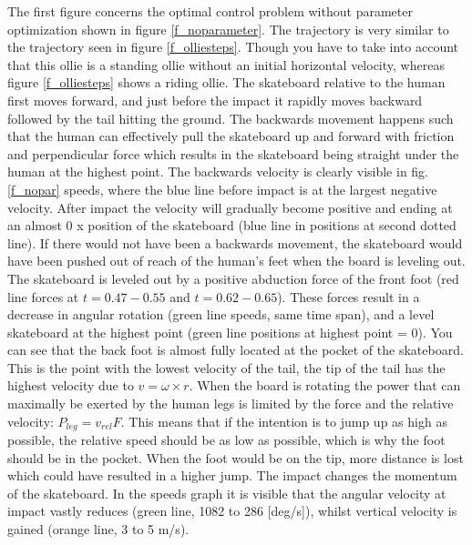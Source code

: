 \noindent The first figure concerns the optimal control problem without parameter optimization shown in figure \ref{f_noparameter}. The trajectory is very similar to the trajectory seen in figure \ref{f_olliesteps}. Though you have to take into account that this ollie is a standing ollie without an initial horizontal velocity, whereas figure \ref{f_olliesteps} shows a riding ollie. The skateboard relative to the human first moves forward, and just before the impact it rapidly moves backward followed by the tail hitting the ground. The backwards movement happens such that the human can effectively pull the skateboard up and forward with friction and perpendicular force which results in the skateboard being straight under the human at the highest point. The backwards velocity is clearly visible in fig. \ref{f_nopar} speeds, where the blue line before impact is at the largest negative velocity. After impact the velocity will gradually become positive and ending at an almost 0 x position of the skateboard (blue line in positions at second dotted line). If there would not have been a backwards movement, the skateboard would have been pushed out of reach of the human's feet when the board is leveling out. The skateboard is leveled out by a positive abduction force of the front foot (red line forces at $t=0.47-0.55$ and $t=0.62-0.65$). These forces result in a decrease in angular rotation (green line speeds, same time span), and a level skateboard at the highest point (green line positions at highest point = 0).
You can see that the back foot is almost fully located at the pocket of the skateboard. This is the point with the lowest velocity of the tail, the tip of the tail has the highest velocity due to $v = \omega \times r$. When the board is rotating the power that can maximally be exerted by the human legs is limited by the force and the relative velocity: $P_{leg} = v_{rel} F$. This means that if the intention is to jump up as high as possible, the relative speed should be as low as possible, which is why the foot should be in the pocket. When the foot would be on the tip, more distance is lost which could have resulted in a higher jump. 
The impact changes the momentum of the skateboard. In the speeds graph it is visible that the angular velocity at impact vastly reduces (green line, 1082 to 286 [deg/s]), whilst vertical velocity is gained (orange line, 3 to 5 m/s).
